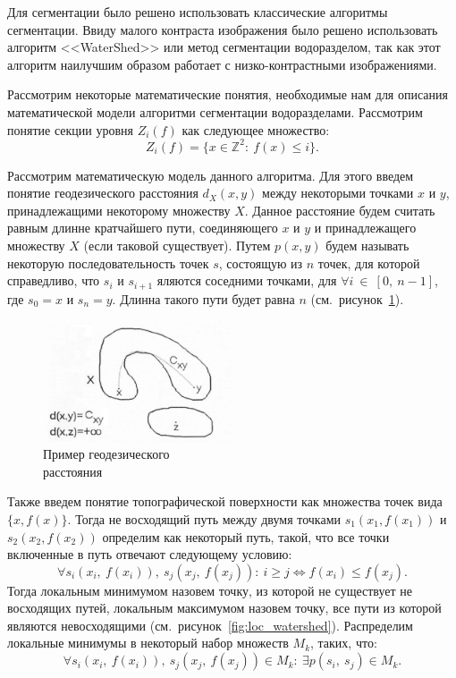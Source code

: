 \documentclass[14pt, a4paper]{extreport}
\begin{document}
	Для сегментации было решено использовать классические алгоритмы сегментации. Ввиду малого контраста изображения было решено использовать алгоритм <<WaterShed>> или метод сегментации водоразделом, так как этот алгоритм наилучшим образом работает с низко-контрастными изображениями.
	
	Рассмотрим некоторые математические понятия, необходимые нам для описания математической модели алгоритми сегментации водоразделами. Рассмотрим понятие секции уровня $Z_i(f)$ как следующее множество:
	\begin{equation*}
		Z_i(f) = \{x\in \mathbb{Z}^2:~f(x)\le i\}.
		\label{Z_i(f)}
	\end{equation*}
	
	Рассмотрим математическую модель данного алгоритма. Для этого введем понятие геодезического расстояния $d_X(x,y)$ между некоторыми точками $x$ и $y$, принадлежащими некоторому множеству $X$. Данное расстояние будем считать равным длинне кратчайшего пути, соединяющего $x$ и $y$ и принадлежащего множеству $X$ (если таковой существует). Путем $p(x,y)$ будем называть некоторую последовательность точек $s$, состоящую из $n$ точек, для которой справедливо, что $s_i$ и $s_{i+1}$ яляются соседними точками, для $\forall i~\in~[0,~n-1]$, где $s_0 = x$ и $s_n = y$. Длинна такого пути будет равна $n$ (см.~рисунок~\ref{fig:gerodesic_distance}).
	
	\begin{figure}[h!]
		\centering
		\includegraphics[width = 0.5\textwidth]{image/chapter_2/gerodesic_distance}	
		\caption{Пример геодезического \\ расстояния}
		\label{fig:gerodesic_distance}
	\end{figure}
	Также введем понятие топографической поверхности как множества точек вида $\{x, f(x)\}$. Тогда не восходящий путь между двумя точками $s_1(x_1,f(x_1))$ и $s_2(x_2,f(x_2))$ определим как некоторый путь, такой, что все точки включенные в путь отвечают следующему условию:
	\begin{equation*}
		\forall s_i(x_i,~f(x_i)),~s_j(x_j,~f(x_j)):~i\ge j \Leftrightarrow f(x_i) \le f(x_j).
		\label{z_X(Y_i)}
	\end{equation*}
	Тогда локальным минимумом назовем точку, из которой не существует не восходящих путей, локальным максимумом назовем точку, все пути из которой являются невосходящими (см.~рисунок~\ref{fig:loc_watershed}). Распределим локальные минимумы в некоторый набор множеств $M_k$, таких, что:
	\begin{equation*}
		\forall s_i(x_i,~f(x_i)),~s_j(x_j,~f(x_j)) \in M_k:~\exists p(s_i,~s_j) \in M_k.
		\label{z_X(Y_i)}
	\end{equation*}
	 
\end{document}
